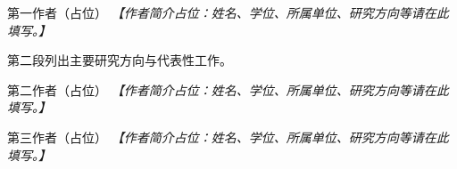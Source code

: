 \documentclass[letterpaper,journal]{IEEEtran}
\begin{document}
\begin{IEEEbiography}{第一作者（占位）}
\textit{【作者简介占位：姓名、学位、所属单位、研究方向等请在此填写。】}

第二段列出主要研究方向与代表性工作。
\end{IEEEbiography}

\begin{IEEEbiography}{第二作者（占位）}
\textit{【作者简介占位：姓名、学位、所属单位、研究方向等请在此填写。】}
\end{IEEEbiography}

\begin{IEEEbiography}{第三作者（占位）}
\textit{【作者简介占位：姓名、学位、所属单位、研究方向等请在此填写。】}
\end{IEEEbiography}

\vfill
\end{document}
